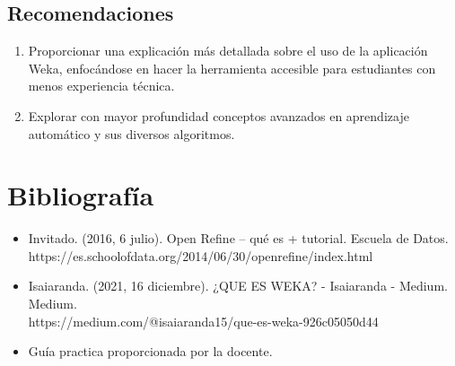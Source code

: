 \documentclass[12pt]{article}
\begin{document}
        \subsection{Recomendaciones}
            \begin{enumerate}
                \item Proporcionar una explicación más detallada sobre el uso de la aplicación Weka, enfocándose en hacer la herramienta accesible para estudiantes con menos experiencia técnica.
                \item Explorar con mayor profundidad conceptos avanzados en aprendizaje automático y sus diversos algoritmos.
            \end{enumerate}
    \newpage
    \section{Bibliografía}
        \begin{itemize}
            \item Invitado. (2016, 6 julio). Open Refine – qué es + tutorial. Escuela de Datos. \\https://es.schoolofdata.org/2014/06/30/openrefine/index.html
            \item Isaiaranda. (2021, 16 diciembre). ¿QUE ES WEKA? - Isaiaranda - Medium. Medium. \\https://medium.com/@isaiaranda15/que-es-weka-926c05050d44
            \item Guía practica proporcionada por la docente.
        \end{itemize}
\end{document}
